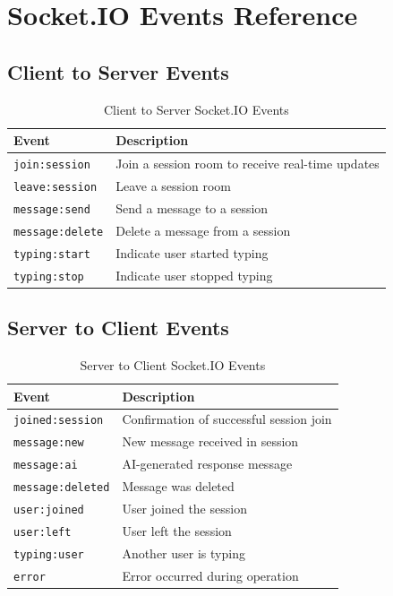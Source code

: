 \documentclass[11pt,a4paper]{article}
\begin{document}
\section{Socket.IO Events Reference}

\subsection{Client to Server Events}

\begin{table}[H]
\centering
\begin{tabular}{p{4cm}p{9cm}}
\toprule
\textbf{Event} & \textbf{Description} \\
\midrule
\texttt{join:session} & Join a session room to receive real-time updates \\
\texttt{leave:session} & Leave a session room \\
\texttt{message:send} & Send a message to a session \\
\texttt{message:delete} & Delete a message from a session \\
\texttt{typing:start} & Indicate user started typing \\
\texttt{typing:stop} & Indicate user stopped typing \\
\bottomrule
\end{tabular}
\caption{Client to Server Socket.IO Events}
\end{table}

\subsection{Server to Client Events}

\begin{table}[H]
\centering
\begin{tabular}{p{4cm}p{9cm}}
\toprule
\textbf{Event} & \textbf{Description} \\
\midrule
\texttt{joined:session} & Confirmation of successful session join \\
\texttt{message:new} & New message received in session \\
\texttt{message:ai} & AI-generated response message \\
\texttt{message:deleted} & Message was deleted \\
\texttt{user:joined} & User joined the session \\
\texttt{user:left} & User left the session \\
\texttt{typing:user} & Another user is typing \\
\texttt{error} & Error occurred during operation \\
\bottomrule
\end{tabular}
\caption{Server to Client Socket.IO Events}
\end{table}
\end{document}
